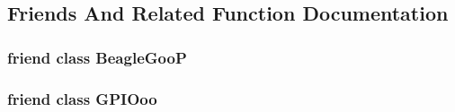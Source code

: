 \subsection{Friends And Related Function Documentation}
\hypertarget{struct_beagle_goo_a3c53b8008fd7b4a4dc43d5c025cfb91f}{
\subsubsection[{Beagle\-Goo\-P}]{\setlength{\rightskip}{0pt plus 5cm}friend class {\bf Beagle\-Goo\-P}\hspace{0.3cm}{\ttfamily [friend]}}}\label{struct_beagle_goo_a3c53b8008fd7b4a4dc43d5c025cfb91f}
\hypertarget{struct_beagle_goo_ad655c01bbbf0f8f066500cb0ea296455}{
\subsubsection[{G\-P\-I\-Ooo}]{\setlength{\rightskip}{0pt plus 5cm}friend class {\bf G\-P\-I\-Ooo}\hspace{0.3cm}{\ttfamily [friend]}}}\label{struct_beagle_goo_ad655c01bbbf0f8f066500cb0ea296455}



